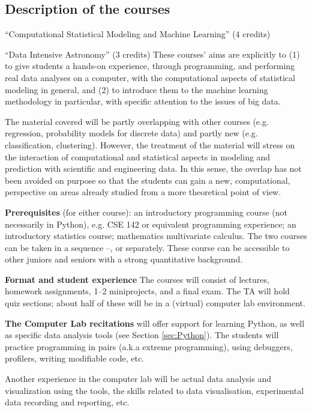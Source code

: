 \subsection{Description of the courses}
\label{sec:course-descr}

\bits
\item \statcl 
``Computational Statistical Modeling and Machine Learning'' (4 credits)
\item \astrocl ``Data Intensive Astronomy'' (3 credits)
\eits
These courses' aims are explicitly to (1) to give students a hands-on experience, through programming, and performing real data analyses on a computer, with the computational aspects of 
statistical modeling in general, and (2) to introduce them to the  machine learning methodology in particular, with specific attention to the issues of big data.

The material covered will be partly overlapping with other courses
(e.g. regression, probability models for discrete data) and partly new
(e.g. classification, clustering). However, the treatment of the
material will stress on the interaction of computational and
statistical aspects in modeling and prediction with scientific and
engineering data. In this sense, the overlap has not been avoided on purpose
so that the students can gain a new, computational, perspective on areas
already studied from a more theoretical point of view. 

{\bf Prerequisites} (for either course): an introductory programming
course (not necessarily in Python), e.g. CSE 142 or equivalent
programming experience; an introductory statistics course; mathematics
multivariate calculus. The two courses can be taken in a sequence
\statcl--\astrocl, or separately. These course can be accessible to
other juniors and seniors with a strong quantitative background.


{\bf Format and student experience} 
The courses will consist of lectures, homework assignments, 1--2
miniprojects, and a final exam. The TA will hold quiz sections; about
half of these will be in a (virtual) computer lab environment. 

{\bf The Computer Lab recitations} will offer support for learning
Python, as well as specific data analysis tools (see Section \ref{sec:Python}).
The students will practice programming in pairs (a.k.a extreme
programming), using debuggers, profilers, writing modifiable code, etc.

Another experience in the computer lab will be actual data analysis
and visualization using the tools, the skills related to data
visualisation, experimental data recording and reporting, etc.

